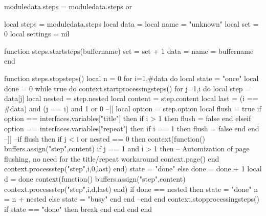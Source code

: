 


\unprotect

\startmode[screen] %

\startluacode

moduledata.steps = moduledata.steps or { }

local steps      = moduledata.steps
local data       = { }
local name       = "unknown"
local set        = 0
local settings   = nil

function steps.startsteps(buffername)
	set  = set + 1
	data = { }
	name = buffername
end

function steps.stopsteps()
	local n = 0
	for i=1,#data do
	local state = "once"
	local done  = 0
	while true do
		context.startprocessingsteps()
		for j=1,i do
			local step    = data[j]
			local nested  = step.nested
			local content = step.content
			local last    = (i == #data) and (j == i) and 1 or 0
			--[[
			local option = step.option
			local flush  = true
			if option == interfaces.variables["title"] then
				if i > 1 then
				flush = false
				end
			elseif option == interfaces.variables["repeat"] then
				if i == 1 then
				flush = false
				end
			end 
			--]]
			--if flush then
			if j < i or nested == 0 then
				context(function()
					buffers.assign("step",content)
					if j == 1 and i > 1 then -- Automization of page flushing, no need for the title/repeat workaround
					context.page()
					end
					context.processstep("step",i,0,last)
				end)
				state = "done"
				else
					done = done + 1
					local d = done
					context(function()
						buffers.assign("step",content)
						context.processstep("step",i,d,last)
					end)
				if done == nested then
					state = "done"
					n = n + nested
				else
					state = "busy"
				end
				end
				--end
			end
			context.stopprocessingsteps()
			if state == "done" then
				break
			end
		end
	end
end

